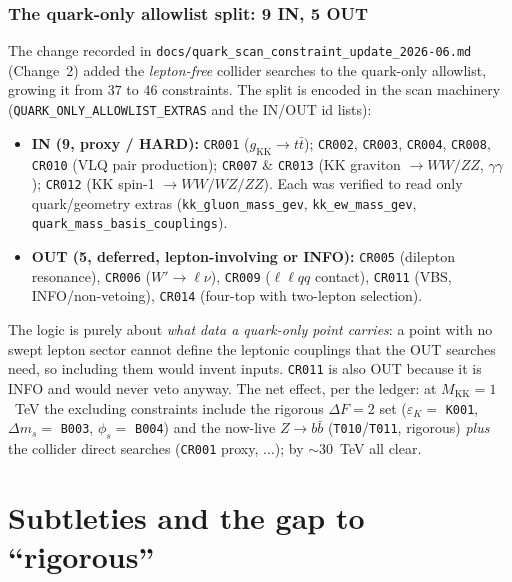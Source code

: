 \documentclass[11pt]{article}
\newcommand{\MKK}{M_{\mathrm{KK}}}
\newcommand{\eps}{\varepsilon}
\newcommand{\gKK}{g_{\mathrm{KK}}}
\newcommand{\code}[1]{\texttt{#1}}
\theoremstyle{definition}
\begin{document}
\section{The quark-only allowlist split: 9 IN, 5 OUT}
\label{sec:allowlist}

The change recorded in \code{docs/quark\_scan\_constraint\_update\_2026-06.md}
(Change~2) added the \emph{lepton-free} collider searches to the quark-only
allowlist, growing it from $37$ to $46$ constraints. The split is encoded in the
scan machinery (\code{QUARK\_ONLY\_ALLOWLIST\_EXTRAS} and the IN/OUT id lists):
\begin{itemize}[leftmargin=1.4em]
\item \textbf{IN (9, proxy / HARD):} \code{CR001} ($\gKK\to t\bar t$);
\code{CR002}, \code{CR003}, \code{CR004}, \code{CR008}, \code{CR010} (VLQ pair
production); \code{CR007} \& \code{CR013} (KK graviton $\to WW/ZZ$,
$\gamma\gamma$); \code{CR012} (KK spin-1 $\to WW/WZ/ZZ$). Each was verified to
read only quark/geometry extras (\code{kk\_gluon\_mass\_gev},
\code{kk\_ew\_mass\_gev}, \code{quark\_mass\_basis\_couplings}).
\item \textbf{OUT (5, deferred, lepton-involving or INFO):} \code{CR005}
(dilepton resonance), \code{CR006} ($W'\to\ell\nu$), \code{CR009} ($\ell\ell qq$
contact), \code{CR011} (VBS, INFO/non-vetoing), \code{CR014} (four-top with
two-lepton selection).
\end{itemize}
The logic is purely about \emph{what data a quark-only point carries}: a point
with no swept lepton sector cannot define the leptonic couplings that the OUT
searches need, so including them would invent inputs. \code{CR011} is also OUT
because it is INFO and would never veto anyway. The net effect, per the ledger:
at $\MKK = 1$~TeV the excluding constraints include the rigorous $\Delta F = 2$
set ($\eps_K = $ \code{K001}, $\Delta m_s = $ \code{B003}, $\phi_s = $
\code{B004}) and the now-live $Z\to b\bar b$ (\code{T010}/\code{T011}, rigorous)
\emph{plus} the collider direct searches (\code{CR001} proxy, $\dots$); by
$\sim 30$~TeV all clear.

\part{Subtleties and the gap to ``rigorous''}
\label{part:subtle}
\end{document}
